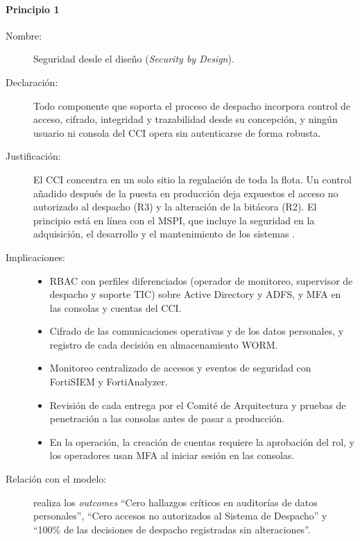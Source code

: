 \paragraph{Principio 1}
\begin{description}
	\item[Nombre:] Seguridad desde el diseño (\textit{Security by Design}).
	\item[Declaración:] Todo componente que soporta el proceso de despacho incorpora control de acceso, cifrado, integridad y trazabilidad desde su concepción, y ningún usuario ni consola del CCI opera sin autenticarse de forma robusta.
	\item[Justificación:] El CCI concentra en un solo sitio la regulación de toda la flota. Un control añadido después de la puesta en producción deja expuestos el acceso no autorizado al despacho (R3) y la alteración de la bitácora (R2). El principio está en línea con el MSPI, que incluye la seguridad en la adquisición, el desarrollo y el mantenimiento de los sistemas \parencite{mintic2021}.
	\item[Implicaciones:] \hfill
	      \begin{itemize}
		      \item RBAC con perfiles diferenciados (operador de monitoreo, supervisor de despacho y soporte TIC) sobre Active Directory y ADFS, y MFA en las consolas y cuentas del CCI.
		      \item Cifrado de las comunicaciones operativas y de los datos personales, y registro de cada decisión en almacenamiento WORM.
		      \item Monitoreo centralizado de accesos y eventos de seguridad con FortiSIEM y FortiAnalyzer.
		      \item Revisión de cada entrega por el Comité de Arquitectura y pruebas de penetración a las consolas antes de pasar a producción.
		      \item En la operación, la creación de cuentas requiere la aprobación del rol, y los operadores usan MFA al iniciar sesión en las consolas.
	      \end{itemize}
	\item[Relación con el modelo:] realiza los \textit{outcomes} ``Cero hallazgos críticos en auditorías de datos personales'', ``Cero accesos no autorizados al Sistema de Despacho'' y ``100\% de las decisiones de despacho registradas sin alteraciones''.
\end{description}

